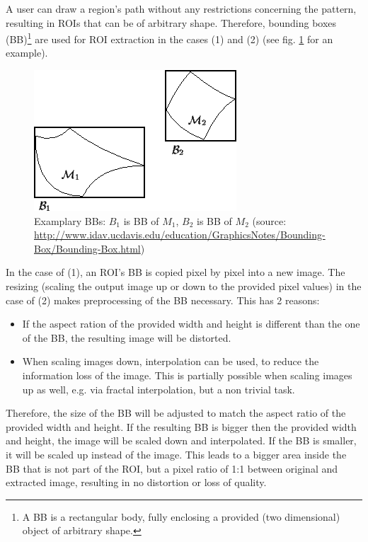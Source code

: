 A user can draw a region's path without any restrictions concerning the pattern, resulting in ROIs that can be of arbitrary shape. Therefore, bounding boxes (BB)\footnote{
	A BB is a rectangular body, fully enclosing a provided (two dimensional) object of arbitrary shape\cite{Toussaint83}.
} are used for ROI extraction in the cases (1) and (2) (see fig. \ref{fig5_bbExample} for an example).

\begin{figure}[H]
	\begin{center}
		\includegraphics[scale=0.6]{img/bb1.png}
		\caption{Examplary BBs: $B_1$ is BB of $M_1$, $B_2$ is BB of $M_2$ (source: \url{http://www.idav.ucdavis.edu/education/GraphicsNotes/Bounding-Box/Bounding-Box.html})}
		\label{fig5_bbExample}
	\end{center}
\end{figure}

In the case of (1), an ROI's BB is copied pixel by pixel into a new image. The resizing (scaling the output image up or down to the provided pixel values) in the case of (2) makes preprocessing of the BB necessary. This has 2 reasons:
\begin{itemize}
	\item If the aspect ration of the provided width and height is different than the one of the BB, the resulting image will be distorted.
	\item When scaling images down, interpolation can be used, to reduce the information loss of the image\cite{Thevanez00}. This is partially possible when scaling images up as well, e.g. via fractal interpolation, but a non trivial task\cite{Guerdri16}.
\end{itemize}

Therefore, the size of the BB will be adjusted to match the aspect ratio of the provided width and height. If the resulting BB is bigger then the provided width and height, the image will be scaled down and interpolated. If the BB is smaller, it will be scaled up instead of the image. This leads to a bigger area inside the BB that is not part of the ROI, but a pixel ratio of 1:1 between original and extracted image, resulting in no distortion or loss of quality.

